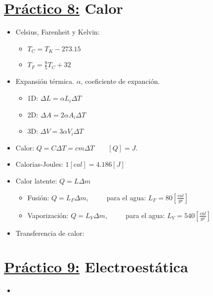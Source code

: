 \documentclass[12pt,a4paper]{article}
\begin{document}
	\section*{\underline{Práctico 8:} Calor}
		\begin{itemize}
			\item Celsius, Farenheit y Kelvin:
				\begin{multicols}{2}
					\begin{itemize}
						\item $T_{C} = T_{K} - 273.15$
						\item $T_{F} = \frac{9}{5} T_{C} + 32$
					\end{itemize}
				\end{multicols}
			\item Expansión térmica. $\alpha$, coeficiente de expanción.
				\begin{multicols}{3}
					\begin{itemize}
						\item 1D: $ \Delta L = \alpha L_{i} \Delta T$
						\item 2D: $ \Delta A = 2\alpha A_{i} \Delta T$
						\item 3D: $ \Delta V = 3\alpha V_{i} \Delta T$
					\end{itemize}
				\end{multicols}
			\item Calor: $Q = C \Delta T = cm \Delta T \qquad [Q] = J$.
			\item Calorias-Joules: $1 [cal] = 4.186 [J]$
			\item Calor latente: $Q = L \Delta m$
				\begin{itemize}
					\item Fusión: $Q = L_{F} \Delta m$, $\qquad$ para el agua: $L_{F} = 80 [\frac{cal}{gr}]$
					\item Vaporización: $Q = L_{V} \Delta m$, $\qquad$ para el agua: $L_{V} = 540 [\frac{cal}{gr}]$
				\end{itemize}
			\item Transferencia de calor:
		\end{itemize}

	\section*{\underline{Práctico 9:} Electroestática}
		\begin{itemize}
			\item
		\end{itemize}
\end{document}
